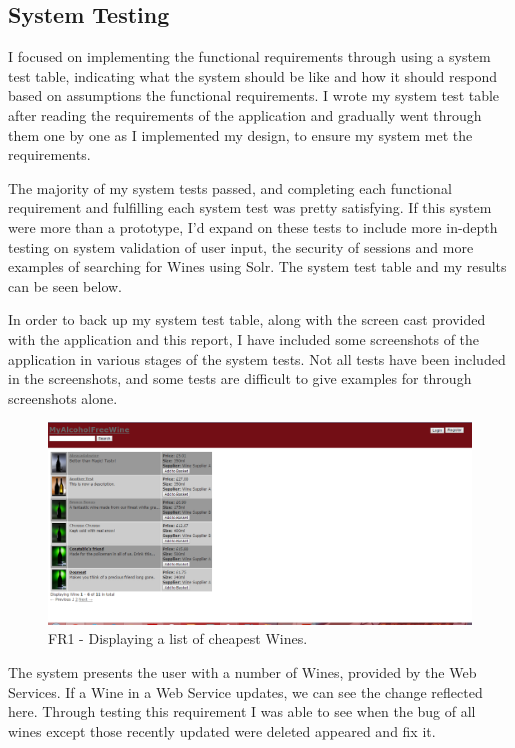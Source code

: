 \documentclass[12pt]{article}
\begin{document}
\subsection{System Testing}
I focused on implementing the functional requirements through using a system test table, indicating what the system should be like and how it should respond based on assumptions the functional requirements. I wrote my system test table after reading the requirements of the application and gradually went through them one by one as I implemented my design, to ensure my system met the requirements.

The majority of my system tests passed, and completing each functional requirement and fulfilling each system test was pretty satisfying. If this system were more than a prototype, I'd expand on these tests to include more in-depth testing on system validation of user input, the security of sessions and more examples of searching for Wines using Solr. The system test table and my results can be seen below.



In order to back up my system test table, along with the screen cast provided with the application and this report, I have included some screenshots of the application in various stages of the system tests. Not all tests have been included in the screenshots, and some tests are difficult to give examples for through screenshots alone.

\begin{figure}[H]
        \centering
                \includegraphics[width=1\textwidth]{assets/FR1_screen_1}
                \caption{FR1 - Displaying a list of cheapest Wines.}
                \label{fig: FR1_1.} 
\end{figure}
The system presents the user with a number of Wines, provided by the Web Services. If a Wine in a Web Service updates, we can see the change reflected here. Through testing this requirement I was able to see when the bug of all wines except those recently updated were deleted appeared and fix it.
\end{document}
